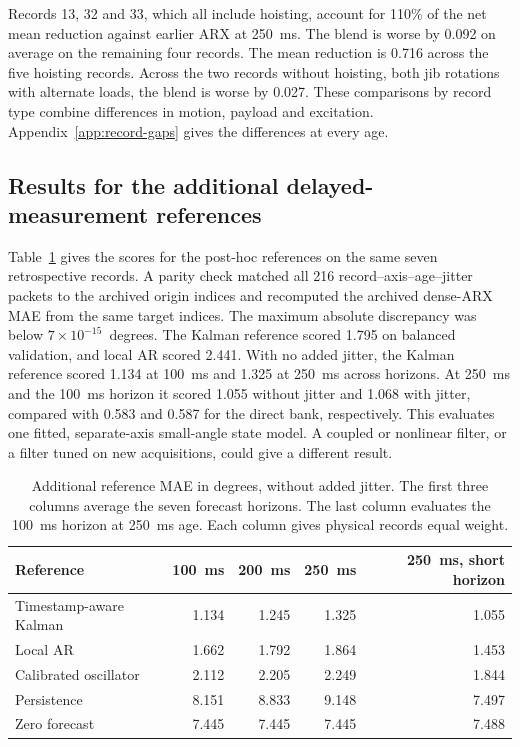 Records 13, 32 and 33, which all include hoisting, account for 110\% of the net mean reduction against earlier ARX at 250~ms. The blend is worse by 0.092\degs{} on average on the remaining four records. The mean reduction is 0.716\degs{} across the five hoisting records. Across the two records without hoisting, both jib rotations with alternate loads, the blend is worse by 0.027\degs. These comparisons by record type combine differences in motion, payload and excitation. Appendix~\ref{app:record-gaps} gives the differences at every age.

\subsection{Results for the additional delayed-measurement references}
\label{sec:additional-results}

Table~\ref{tab:added-baselines} gives the scores for the post-hoc references on the same seven retrospective records. A parity check matched all 216 record--axis--age--jitter packets to the archived origin indices and recomputed the archived dense-ARX MAE from the same target indices. The maximum absolute discrepancy was below $7\times10^{-15}$~degrees. The Kalman reference scored 1.795\degs{} on balanced validation, and local AR scored 2.441\degs. With no added jitter, the Kalman reference scored 1.134\degs{} at 100~ms and 1.325\degs{} at 250~ms across horizons. At 250~ms and the 100~ms horizon it scored 1.055\degs{} without jitter and 1.068\degs{} with jitter, compared with 0.583\degs{} and 0.587\degs{} for the direct bank, respectively. This evaluates one fitted, separate-axis small-angle state model. A coupled or nonlinear filter, or a filter tuned on new acquisitions, could give a different result.

\begin{table}[H]
\centering\small
\caption{Additional reference MAE in degrees, without added jitter. The first three columns average the seven forecast horizons. The last column evaluates the 100~ms horizon at 250~ms age. Each column gives physical records equal weight.}
\label{tab:added-baselines}
\begin{tabular}{@{}lrrrr@{}}
\toprule
Reference & 100~ms & 200~ms & 250~ms & 250~ms, short horizon \\
\midrule
Timestamp-aware Kalman & 1.134 & 1.245 & 1.325 & 1.055 \\
Local AR & 1.662 & 1.792 & 1.864 & 1.453 \\
Calibrated oscillator & 2.112 & 2.205 & 2.249 & 1.844 \\
Persistence & 8.151 & 8.833 & 9.148 & 7.497 \\
Zero forecast & 7.445 & 7.445 & 7.445 & 7.488 \\
\bottomrule
\end{tabular}
\end{table}

